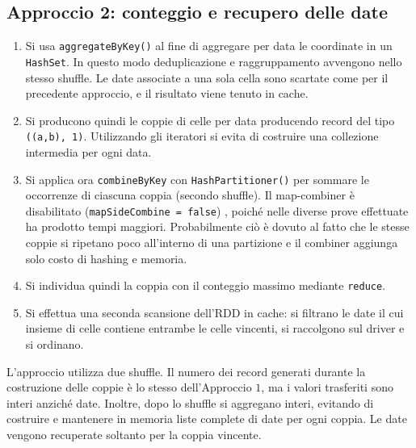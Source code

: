 \documentclass[10pt,a4paper]{article}
\begin{document}
\subsection{Approccio 2: conteggio e recupero delle date}
\begin{enumerate}
  \item Si usa \texttt{aggregateByKey()} al fine di aggregare per data le coordinate in un \texttt{HashSet}. In questo modo deduplicazione e raggruppamento avvengono nello stesso shuffle. Le date associate a una sola cella sono scartate come per il precedente approccio, e il risultato viene tenuto in cache.
  \item Si producono quindi le coppie di celle per data producendo record del tipo \texttt{((a,b), 1)}. Utilizzando gli iteratori si evita di costruire una collezione intermedia per ogni data.
  \item Si applica ora \texttt{combineByKey} con \texttt{HashPartitioner()} per sommare le occorrenze di ciascuna coppia (secondo shuffle). Il map-combiner è disabilitato (\texttt{mapSideCombine = false}) , poiché nelle diverse prove effettuate ha prodotto tempi maggiori. Probabilmente ciò è dovuto al fatto che  le stesse coppie si ripetano poco all'interno di una partizione e il combiner aggiunga solo costo di hashing e memoria.
  \item Si individua quindi la coppia con il conteggio massimo mediante \texttt{reduce}.
  \item Si effettua una seconda scansione dell'RDD in cache: si filtrano le date il cui insieme di celle contiene entrambe le celle vincenti, si raccolgono sul driver e si ordinano.
\end{enumerate}
L'approccio utilizza due shuffle. Il numero dei record generati durante la costruzione delle coppie è lo stesso dell'Approccio $1$, ma i valori trasferiti sono interi anziché date. Inoltre, dopo lo shuffle si aggregano interi, evitando di costruire e mantenere in memoria liste complete di date per ogni coppia. Le date vengono recuperate soltanto per la coppia vincente.
\end{document}
